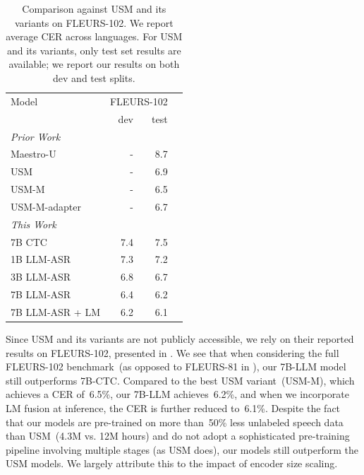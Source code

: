 \documentclass[]{fairmeta}
\begin{document}
\begin{table}[htbp]
  \centering
  \begin{tabular}{lrrr}
    \toprule
    Model & \multicolumn{2}{c}{FLEURS-102}  \\
    & dev & test  \\
    \midrule
    \textit{Prior Work}  \\
    Maestro-U~\citep{chen2022maestro}  &   -   &  8.7  \\
    USM                                &   -   &  6.9  \\
    USM-M                              &   -   &  6.5  \\
    USM-M-adapter                      &   -   &  6.7  \\
    \midrule
    \textit{This Work}  \\
    7B CTC                             &  7.4  &  7.5  \\
    1B LLM-ASR                         &  7.3  &  7.2  \\
    3B LLM-ASR                         &  6.8  &  6.7  \\
    7B LLM-ASR                         &  6.4  &  6.2  \\
    7B LLM-ASR + LM                    &  6.2  &  6.1  \\
    \bottomrule
  \end{tabular}
  \caption{Comparison against USM and its variants on FLEURS-102.  We report average CER across languages.  For USM and its variants, only test set results are available; we report our results on both dev and test splits.}
  \label{tab:vs_usm}
\end{table}

Since USM and its variants are not publicly accessible, we rely on their reported results on FLEURS-102, presented in . We see that when considering the full FLEURS-102 benchmark~(as opposed to FLEURS-81 in ), our 7B-LLM model still outperforms 7B-CTC. Compared to the best USM variant~(USM-M), which achieves a CER of~6.5\%, our 7B-LLM achieves~6.2\%, and when we incorporate LM fusion at inference, the CER is further reduced to~6.1\%.  Despite the fact that our models are pre-trained on more than~50\% less unlabeled speech data than USM~(4.3M vs. 12M hours) and do not adopt a sophisticated pre-training pipeline involving multiple stages (as USM does), our models still outperform the USM models. We largely attribute this to the impact of encoder size scaling.
\end{document}
